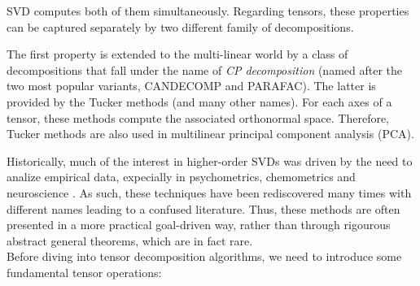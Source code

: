 SVD computes both of them simultaneously. Regarding tensors, these properties can be captured separately by two different family of decompositions.

The first property is extended to the multi-linear world by a class of decompositions that fall under the name of \textit{CP decomposition} (named after the two most popular variants, CANDECOMP and PARAFAC). The latter is provided by the Tucker methods (and many other names). For each axes of a tensor, these methods compute the associated orthonormal space. Therefore, Tucker methods are also used in multilinear principal component analysis (PCA). 
\newline 
	
Historically, much of the interest in higher-order SVDs was driven by the need to analize empirical data, expecially in psychometrics, chemometrics and neuroscience \parencite{tensor2009kolda}. As such, these techniques have been rediscovered many times with different names leading to a confused literature. Thus, these methods are often presented in a more practical goal-driven way, rather than through rigourous abstract general theorems, which are in fact rare.\\

Before diving into tensor decomposition algorithms, we need to introduce some fundamental tensor operations: 

